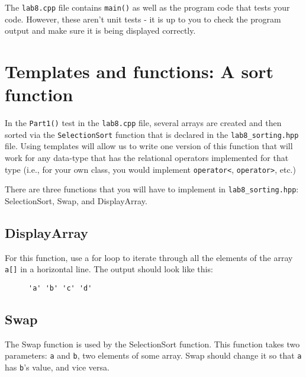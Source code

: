\documentclass[a4paper,12pt,oneside]{book}
\begin{document}
The \texttt{lab8.cpp} file contains \texttt{main()} as well as the
program code that tests your code. However, these aren't unit tests -
it is up to you to check the program output and make sure it is
being displayed correctly.

    \tableofcontents


    \newpage{}

    \section{Templates and functions: A sort function}

    In the \texttt{Part1()} test in the \texttt{lab8.cpp} file,
    several arrays are created and then sorted via the \texttt{SelectionSort}
    function that is declared in the \texttt{lab8\_sorting.hpp} file.
    Using templates will allow us to write one version of this function
    that will work for any data-type that has the relational operators
    implemented for that type (i.e., for your own class, you would implement
    \texttt{operator<}, \texttt{operator>}, etc.)

    There are three functions that you will have to implement in \texttt{lab8\_sorting.hpp}:
    SelectionSort, Swap, and DisplayArray.

    \subsection{DisplayArray}

    For this function, use a for loop to iterate through all the elements
    of the array \texttt{a[]} in a horizontal line. The output should
    look like this:

\begin{figure}[h]
\centering
\begin{BVerbatim}
'a' 'b' 'c' 'd'
\end{BVerbatim}
\end{figure}

    \subsection{Swap}

    The Swap function is used by the SelectionSort function.
    This function takes two parameters: \texttt{a} and \texttt{b},
    two elements of some array. Swap should change it so that \texttt{a}
    has \texttt{b}'s value, and vice versa. 
\end{document}
